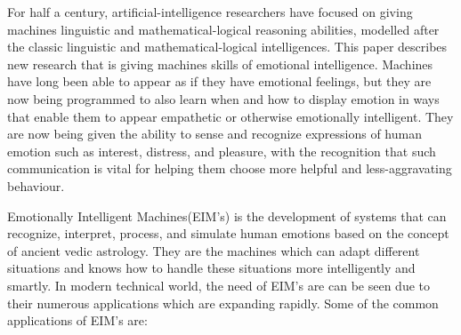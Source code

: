 For half a century, artificial-intelligence researchers have focused on giving machines linguistic and mathematical-logical reasoning abilities, modelled after the classic linguistic and mathematical-logical intelligences. This paper describes new research that is giving machines skills of emotional intelligence. Machines have long been able to appear as if they have emotional feelings, but they are now being programmed to also learn when and how to display emotion in ways that enable them to appear empathetic or otherwise emotionally intelligent. They are now being given the ability to sense and recognize expressions of human emotion such as interest, distress, and pleasure, with the recognition that such communication is vital for helping them choose more helpful and less-aggravating behaviour.

Emotionally Intelligent Machines(EIM's) is the development of systems that can recognize, interpret, process, and simulate human emotions based on the concept of ancient vedic astrology. They are the machines which can adapt different situations and knows how to handle these situations more intelligently and smartly. In modern technical world, the need of EIM's are can be seen due to their numerous applications which are expanding rapidly. Some of the common applications of EIM's are: